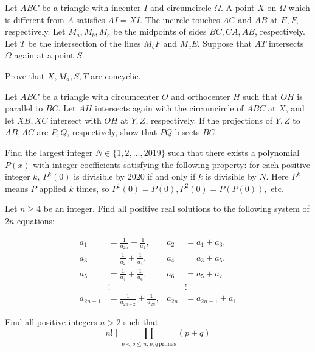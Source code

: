 \documentclass[11pt]{scrartcl}
\begin{document}
\begin{problem}[727078403801409]
Let $ABC$ be a triangle with incenter $I$ and circumcircle $\Omega$. A point $X$ on $\Omega$ which is different from $A$ satisfies $AI=XI$. The incircle touches $AC$ and $AB$ at $E, F$, respectively. Let $M_a, M_b, M_c$ be the midpoints of sides $BC, CA, AB$, respectively. Let $T$ be the intersection of the lines $M_bF$ and $M_cE$. Suppose that $AT$ intersects $\Omega$ again at a point $S$.

Prove that $X, M_a, S, T$ are concyclic.
\end{problem}
\begin{problem}[1427062131747349943]
Let $ABC$ be a triangle with circumcenter $O$ and orthocenter $H$ such that $OH$ is parallel to $BC$. Let $AH$ intersects again with the circumcircle of $ABC$ at $X$, and let $XB, XC$ intersect with $OH$ at $Y, Z$, respectively. If the projections of $Y,Z$ to $AB,AC$ are $P,Q$, respectively, show that $PQ$ bisects $BC$.
\end{problem}
\begin{problem}[4037864050528368034]
Find the largest integer $N \in \{1, 2, \ldots , 2019 \}$ such that there exists a polynomial $P(x)$ with integer coefficients satisfying the following property: for each positive integer $k$, $P^k(0)$ is divisible by $2020$ if and only if $k$ is divisible by $N$. Here $P^k$ means $P$ applied $k$ times, so $P^1(0)=P(0), P^2(0)=P(P(0)),$ etc.
\end{problem}
\begin{problem}[4835329555526569551]
Let $n \geq 4$ be an integer. Find all positive real solutions to the following system of $2n$ equations:

\begin{align*}
a_{1} &=\frac{1}{a_{2 n}}+\frac{1}{a_{2}}, & a_{2}&=a_{1}+a_{3}, \\
a_{3}&=\frac{1}{a_{2}}+\frac{1}{a_{4}}, & a_{4}&=a_{3}+a_{5}, \\
a_{5}&=\frac{1}{a_{4}}+\frac{1}{a_{6}}, & a_{6}&=a_{5}+a_{7} \\
&\vdots & &\vdots \\
a_{2 n-1}&=\frac{1}{a_{2 n-2}}+\frac{1}{a_{2 n}}, & a_{2 n}&=a_{2 n-1}+a_{1}
\end{align*}
\end{problem}
\begin{problem}[6919176010062551987]
Find all positive integers $n>2$ such that
$$ n! \mid \prod_{ p<q\le n, p,q \, \text{primes}} (p+q)$$
\end{problem}
\end{document}

